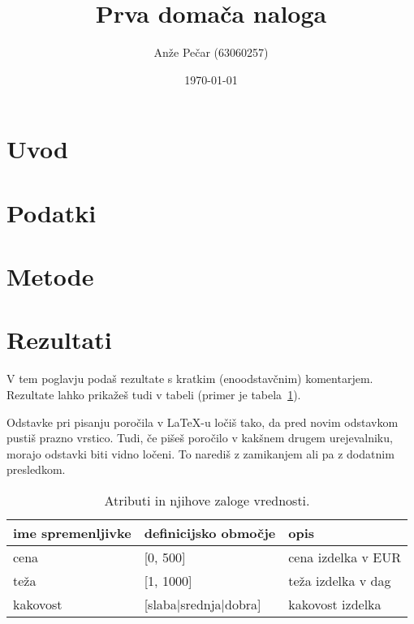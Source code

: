 \documentclass[a4paper,11pt]{article}
\title{Prva domača naloga}
\author{Anže Pečar (63060257)}
\date{\today}
\begin{document}
\maketitle

\section{Uvod}

\section{Podatki}

\section{Metode}



\section{Rezultati}

V tem poglavju podaš rezultate s kratkim (enoodstavčnim)
komentarjem. Rezultate lahko prikažeš tudi v tabeli (primer je
tabela~\ref{tab1}).

Odstavke pri pisanju poročila v LaTeX-u ločiš tako, da pred novim
odstavkom pustiš prazno vrstico. Tudi, če pišeš poročilo v kakšnem
drugem urejevalniku, morajo odstavki biti vidno ločeni. To narediš z
zamikanjem ali pa z dodatnim presledkom.

\begin{table}[htbp]
\caption{Atributi in njihove zaloge vrednosti.}
\label{tab1}
\begin{center}
\begin{tabular}{llp{3cm}}
\hline
ime spremenljivke & definicijsko območje & opis \\
\hline
cena & [0, 500] & cena izdelka v EUR\\
teža & [1, 1000] & teža izdelka v dag \\
kakovost & [slaba|srednja|dobra] & kakovost izdelka \\
\hline
\end{tabular}
\end{center}
\end{table}
\end{document}
